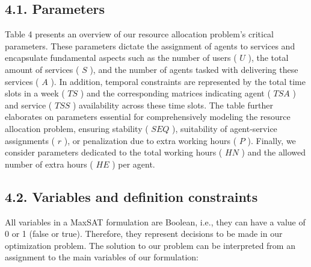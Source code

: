 \documentclass[10pt]{article}
\begin{document}
\subsection*{4.1. Parameters}
Table 4 presents an overview of our resource allocation problem's critical parameters. These parameters dictate the assignment of agents to services and encapsulate fundamental aspects such as the number of users ( $U$ ), the total amount of services ( $S$ ), and the number of agents tasked with delivering these services ( $A$ ). In addition, temporal constraints are represented by the total time slots in a week ( $T S$ ) and the corresponding matrices indicating agent ( $T S A$ ) and service ( $T S S$ ) availability across these time slots. The table further elaborates on parameters essential for comprehensively modeling the resource allocation problem, ensuring stability ( $S E Q$ ), suitability of agent-service assignments ( $r$ ), or penalization due to extra working hours ( $P$ ). Finally, we consider parameters dedicated to the total working hours ( $H N$ ) and the allowed number of extra hours ( $H E$ ) per agent.

\subsection*{4.2. Variables and definition constraints}
All variables in a MaxSAT formulation are Boolean, i.e., they can have a value of 0 or 1 (false or true). Therefore, they represent decisions to be made in our optimization problem. The solution to our problem can be interpreted from an assignment to the main variables of our formulation:
\end{document}
